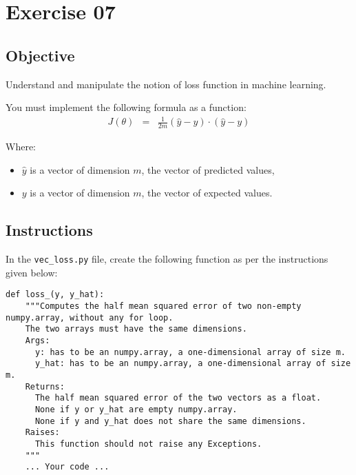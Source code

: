 \chapter{Exercise 07}
\makeheaderfilesforbidden
  
\section*{Objective}
Understand and manipulate the notion of loss function in machine learning.
  
You must implement the following formula as a function:  
$$
\begin{matrix}
  J(\theta) &  = & \frac{1}{2m}(\hat{y} - y) \cdot(\hat{y}- y)
\end{matrix}
$$

Where:
\begin{itemize}
  \item $\hat{y}$ is a vector of dimension $m$, the vector of predicted values,
  \item $y$ is a vector of dimension $m$, the vector of expected values.
\end{itemize}

\newpage

\section*{Instructions}
In the \texttt{vec\_loss.py} file, create the following function as per the instructions given below:

\begin{verbatim}
def loss_(y, y_hat):
    """Computes the half mean squared error of two non-empty numpy.array, without any for loop.
    The two arrays must have the same dimensions.
    Args:
      y: has to be an numpy.array, a one-dimensional array of size m.
      y_hat: has to be an numpy.array, a one-dimensional array of size m.
    Returns:
      The half mean squared error of the two vectors as a float.
      None if y or y_hat are empty numpy.array.
      None if y and y_hat does not share the same dimensions.
    Raises:
      This function should not raise any Exceptions.
    """
    ... Your code ...
\end{verbatim}


